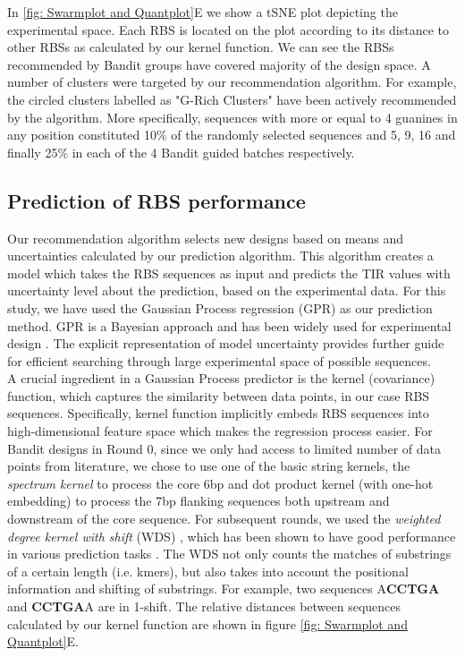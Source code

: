 \documentclass{article}
\newcommand{\maciej}[1]{\textcolor{blue}{#1}}
\begin{document}
In \ref{fig: Swarmplot and Quantplot}E we show a tSNE plot depicting the experimental space.
Each RBS is located on the plot according to its distance to other RBSs as calculated by our kernel function.
We can see the RBSs recommended by Bandit groups have covered majority of the design space. 
A number of clusters were targeted by our recommendation algorithm.
For example, the circled clusters labelled as "G-Rich Clusters" have been actively recommended by the algorithm.
More specifically, sequences with more or equal to 4 guanines in any position constituted 10\% of the randomly selected sequences and 5, 9, 16 and finally 25\% in each of the 4 Bandit guided batches respectively.

\subsection{Prediction of RBS performance}

Our recommendation algorithm selects new designs based on means and uncertainties calculated by our prediction algorithm.
This algorithm creates a model which takes the RBS sequences as input and predicts the TIR values with uncertainty level about the prediction, based on the experimental data.
For this study, we have used the Gaussian Process regression (GPR) as our prediction method.
GPR is a Bayesian approach and has been widely used for experimental design \cite{srinivas2012information, romero_navigating_2013}.
The explicit representation of model uncertainty provides further guide for efficient searching through large experimental space of possible sequences.\\
A crucial ingredient in a Gaussian Process predictor \cite{Rasmussen2004} is the kernel (covariance) function, which captures the similarity between data points, in our case RBS sequences.
Specifically, kernel function implicitly embeds RBS sequences into high-dimensional feature space which makes the regression process easier.
For Bandit designs in Round 0, since we only had access to limited number of data points from literature, we chose to use one of the basic string kernels, the \textit{spectrum kernel} \cite{leslie2001spectrum} to process the core 6bp and dot product kernel \cite{Rasmussen2004} (with one-hot embedding) to process the 7bp flanking sequences both upstream and downstream of the core sequence.
For subsequent rounds, we used 
the \textit{weighted degree kernel with shift} (WDS) \cite{ratsch_rase_2005_wds}, which has been shown to have good performance in various prediction tasks \cite{Ben-Hur2008}.
The WDS not only counts the matches of substrings of a certain length (i.e. kmers), but also takes into account the positional information and shifting of substrings.
For example, two sequences A\textbf{CCTGA} and \textbf{CCTGA}A are in 1-shift.
The relative distances between sequences calculated by our kernel function are shown in figure \ref{fig: Swarmplot and Quantplot}E.\\
\end{document}
